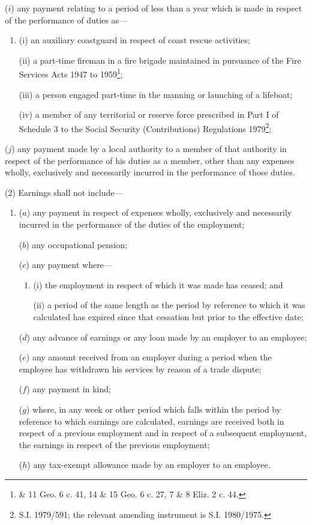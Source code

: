 \documentclass[12pt,a4paper]{article}
\begin{document}
\begin{enumerate}
($i$) any payment relating to a period of less than a year which is made in respect of the performance of duties as—
\begin{enumerate}\item[]
(i) an auxiliary coastguard in respect of coast rescue activities;

(ii) a part-time fireman in a fire brigade maintained in pursuance of the Fire Services Acts 1947 to 1959\footnote{ \& 11 Geo. 6 c. 41, 14 \& 15 Geo. 6 c. 27, 7 \& 8 Eliz. 2 c. 44.};

(iii) a person engaged part-time in the manning or launching of a lifeboat;

(iv) a member of any territorial or reserve force prescribed in Part I of Schedule 3 to the Social Security (Contributions) Regulations 1979\footnote{\frenchspacing S.I. 1979/591; the relevant amending instrument is S.I. 1980/1975.};
\end{enumerate}

($j$) any payment made by a local authority to a member of that authority in respect of the performance of his duties as a member, other than any expenses wholly, exclusively and necessarily incurred in the performance of those duties.
\end{enumerate}

(2) Earnings shall not include—
\begin{enumerate}\item[]
($a$) any payment in respect of expenses wholly, exclusively and necessarily incurred in the performance of the duties of the employment;

($b$) any occupational pension;

($c$) any payment where—
\begin{enumerate}\item[]
(i) the employment in respect of which it was made has ceased; and

(ii) a period of the same length as the period by reference to which it was calculated has expired since that cessation but prior to the effective date;
\end{enumerate}

($d$) any advance of earnings or any loan made by an employer to an employee;

($e$) any amount received from an employer during a period when the employee has withdrawn his services by reason of a trade dispute;

($f$) any payment in kind;

($g$) where, in any week or other period which falls within the period by reference to which earnings are calculated, earnings are received both in respect of a previous employment and in respect of a subsequent employment, the earnings in respect of the previous employment;

($h$) any tax-exempt allowance made by an employer to an employee.
\end{enumerate}
\end{document}
